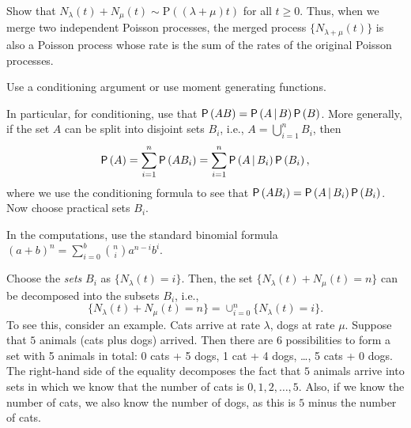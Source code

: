 \begin{exercise} 
Show that  $N_\lambda(t) + N_\mu(t) \sim \text{P}((\lambda + \mu)t)$ for all $t\geq 0$. Thus, when we merge two independent Poisson processes, the merged process $\{N_{\lambda+\mu}(t)\}$ is also a Poisson process whose rate is the sum of the rates of the original Poisson processes.
  \begin{hint}
Use a conditioning argument or use moment generating functions.

In particular, for
    conditioning, use that $\P{AB} = \P{A\given B}\P{B}$. More
    generally, if the set $A$ can be split into disjoint sets $B_i$,
    i.e., $A=\bigcup_{i=1}^n B_i$, then
    \begin{equation*}
      \P{A} = \sum_{i=1}^n \P{A B_i} = \sum_{i=1}^n \P{A\given B_i} \P{B_i},
    \end{equation*}
    where we use the conditioning formula to see that
    $\P{A B_i} = \P{A \given B_i} \P{B_i}$.  Now choose practical sets
    $B_i$.  

In the computations, use the standard binomial formula $(a+b)^n = \sum_{i=0}^b {n \choose i} a^{n-i} b^i$. 
  \end{hint}
    \begin{solution}
Choose the \emph{sets} $B_i$ as $\{N_\lambda(t) = i\}$. Then, the set $\{N_\lambda(t) + N_\mu(t) = n\}$ can be decomposed into the subsets $B_i$, i.e., 
\begin{equation*}
\{N_\lambda(t) + N_\mu(t) = n\} =  \cup_{i=0}^n \{N_\lambda(t) = i\}.
\end{equation*}
To see this, consider an example. Cats arrive at rate $\lambda$, dogs at rate $\mu$. Suppose that $5$ animals (cats plus dogs) arrived. Then  there are 6 possibilities to form a set with 5 animals in total: 0 cats + 5 dogs, 1 cat + 4 dogs, \ldots, 5 cats + 0 dogs. The right-hand side of the equality decomposes  the fact that $5$ animals arrive into sets in which we know that the number of cats is $0, 1, 2,\ldots, 5$. Also,  if we know the number of cats, we also know the number of dogs, as this is $5$ minus the number of cats. %


\end{solution}
\end{exercise}
